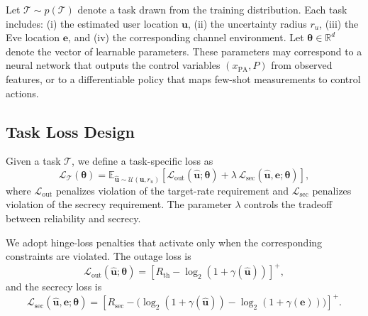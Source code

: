 \documentclass[journal,10pt]{IEEEtran}
\begin{document}
Let $\mathcal{T} \sim p(\mathcal{T})$ denote a task drawn from the training distribution. Each task includes: (i) the estimated user location $\mathbf{u}$, (ii) the uncertainty radius $r_u$, (iii) the Eve location $\mathbf{e}$, and (iv) the corresponding channel environment. Let $\boldsymbol{\theta} \in \mathbb{R}^d$ denote the vector of learnable parameters. These parameters may correspond to a neural network that outputs the control variables $(x_{\mathrm{PA}}, P)$ from observed features, or to a differentiable policy that maps few-shot measurements to control actions.

\subsection{Task Loss Design}
Given a task $\mathcal{T}$, we define a task-specific loss as
\begin{equation}
\mathcal{L}_{\mathcal{T}}(\boldsymbol{\theta})
=
\mathbb{E}_{\hat{\mathbf{u}} \sim \mathcal{U}(\mathbf{u}, r_u)}
\!\left[
\mathcal{L}_{\mathrm{out}}(\hat{\mathbf{u}};\boldsymbol{\theta})
+ \lambda\, \mathcal{L}_{\mathrm{sec}}(\hat{\mathbf{u}},\mathbf{e};\boldsymbol{\theta})
\right],
\label{eq:task_loss}
\end{equation}
where $\mathcal{L}_{\mathrm{out}}$ penalizes violation of the target-rate requirement and $\mathcal{L}_{\mathrm{sec}}$ penalizes violation of the secrecy requirement. The parameter $\lambda$ controls the tradeoff between reliability and secrecy.

We adopt hinge-loss penalties \cite{Lee_2019_CVPR} that activate only when the corresponding constraints are violated. The outage loss is
\begin{equation}
\mathcal{L}_{\mathrm{out}}(\hat{\mathbf{u}};\boldsymbol{\theta})
=
\left[
R_{\mathrm{th}} - \log_2\!\left(1+\gamma(\hat{\mathbf{u}})\right)
\right]^+,
\label{eq:outage_loss}
\end{equation}
and the secrecy loss is
\begin{equation}
\mathcal{L}_{\mathrm{sec}}(\hat{\mathbf{u}},\mathbf{e};\boldsymbol{\theta})
\!=\!\!
\left[
R_{\mathrm{sec}}
\!-\!
\Big(
\log_2\!\left(1\!+\gamma(\hat{\mathbf{u}})\right)\!-\!\log_2\!\left(1\!+\gamma(\mathbf{e})\right)
\Big)
\right]^+.
\label{eq:secrecy_loss}
\end{equation}
\end{document}
